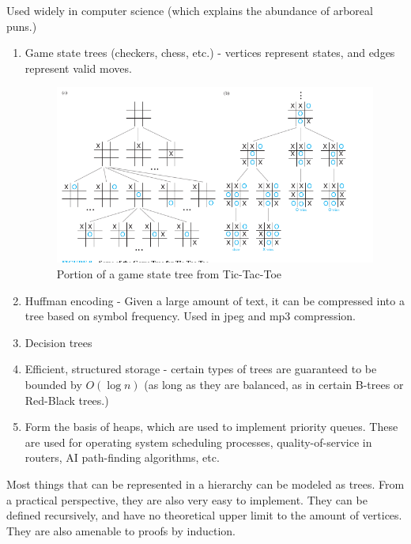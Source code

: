\documentclass[a4paper,10pt]{report}
\begin{document}
Used widely in computer science (which explains the abundance of arboreal puns.)
\begin{enumerate}
	\item Game state trees (checkers, chess, etc.) - vertices represent states, and edges represent valid moves.
	\begin{figure}[h!]
	\begin{centering}
	\begin{center}
	\includegraphics[width=\linewidth]{./game_states.png}
	\caption{Portion of a game state tree from Tic-Tac-Toe}
	\label{fig:game_state}
	\end{center}
	\par\end{centering}
\end{figure}
	\item Huffman encoding - Given a large amount of text, it can be compressed into a tree based on symbol frequency. Used in jpeg and mp3 compression.
	\item Decision trees
	\item Efficient, structured storage - certain types of trees are guaranteed to be bounded by $O(\log n)$ (as long as they are balanced, as in certain B-trees or Red-Black trees.)
	\item Form the basis of heaps, which are used to implement priority queues. These are used for operating system scheduling processes, quality-of-service in routers, AI path-finding algorithms, etc.
\end{enumerate}
Most things that can be represented in a hierarchy can be modeled as trees. From a practical perspective, they are also very easy to implement. They can be defined recursively, and have no theoretical upper limit to the amount of vertices. They are also amenable to proofs by induction.
\end{document}
